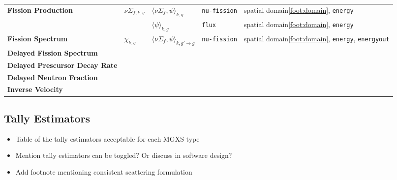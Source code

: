 \begin{table}[h!]
\begin{tabular}{ m{2.3cm} m{1.2cm} m{2cm} m{2.5cm} l }
  \midrule

  \multirow{2}{*}{\parbox{1.5cm}{\bf Fission \hspace{1cm} Production}} & \multirow{2}{*}{$\nu\Sigma_{f,k,g}$} & $\langle \nu\Sigma_{f}, \psi \rangle_{k,g}$ & \texttt{nu-fission} & spatial domain\ref{foot:domain}, \texttt{energy} \\
  \cline{3-5}
  & & $\langle \psi \rangle_{k,g}$ & \texttt{flux} & spatial domain\ref{foot:domain}, \texttt{energy} \\

  \midrule
  
  \parbox{1.5cm}{\parbox{1.2cm}{\bf Fission Spectrum}} & $\chi_{k,g}$ & $\langle \nu\Sigma_{f}, \psi \rangle_{k,g'\rightarrow g}$ & \texttt{nu-fission} & spatial domain\ref{foot:domain}, \texttt{energy}, \texttt{energyout} \\

  \midrule

  \parbox{1.5cm}{\parbox{1.9cm}{\bf Delayed Fission Spectrum}} & & & \\

  \midrule

  \parbox{1.5cm}{\parbox{2.3cm}{\bf Delayed Prescursor Decay Rate}} & & & \\

  \midrule

  \parbox{1.5cm}{\parbox{2cm}{\bf Delayed Neutron Fraction}} & & & \\

  \midrule

  \parbox{1.5cm}{\parbox{1.2cm}{\bf Inverse Velocity}} & & & \\

  \midrule

\end{tabular}
\end{table}



\subsection{Tally Estimators}
\label{subsec:tally-est}

\begin{itemize}[noitemsep]
\item Table of the tally estimators acceptable for each MGXS type
\item Mention tally estimators can be toggled? Or discuss in software design?
\item Add footnote mentioning consistent scattering formulation
\end{itemize}

